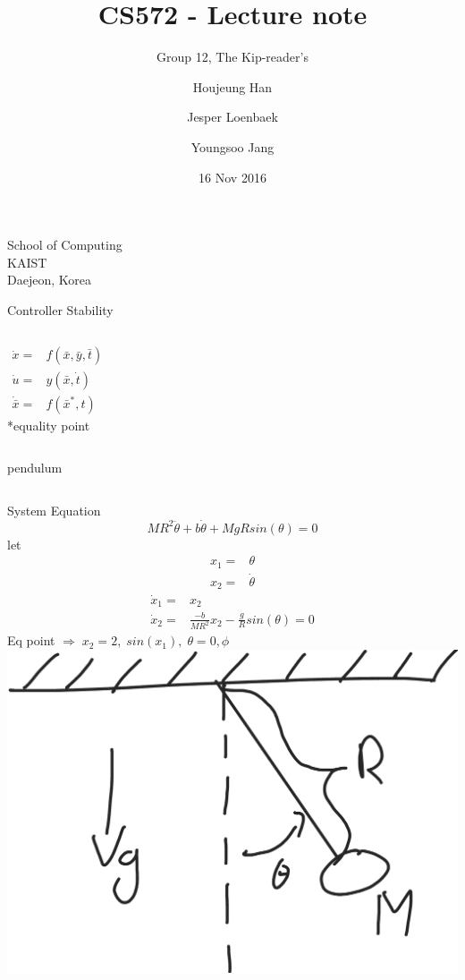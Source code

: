 \documentclass{beamer}
\begin{document}
\title{CS572 - Lecture note}
\subtitle{Group 12, The Kip-reader's}
\author{Houjeung Han \and Jesper Loenbaek \and Youngsoo Jang}
\institute%
{
    School of Computing\\
    KAIST\\
    Daejeon, Korea
}

\date{16 Nov 2016}
\frame{\titlepage}

\begin{frame}{Controller Stability}
    \begin{columns}[T]
    \begin{align*}
        \dot{x} =& f(\bar{x},\bar{y},\bar{t})\\
        \dot{u} =& y(\bar{x},\dot{t})\\
        \dot{\bar{x}} =& f(\bar{x}^*,t)
    \end{align*}
    *equality point
    \end{columns}
\end{frame}

\begin{frame}{pendulum}
    \begin{columns}[T]
    System Equation
    $$MR^2 \ddot{\theta} + b\dot{\theta} + MgRsin(\theta)=0$$
    let
    \vspace*{-0.5cm}
    \begin{align*}
        x_1 =& \theta\\
        x_2 =& \dot{\theta}
    \end{align*}
    \vspace*{-1cm}
    \begin{align*}
        \dot{x}_1 =& x_2\\
        \dot{x}_2 =& \frac{-b}{MR^2}x_2-\frac{g}{R}sin(\theta)=0
    \end{align*}
    Eq point $\Rightarrow \; x_2=2,\; sin(x_1),\; \theta=0,\phi$
        \includegraphics[width=\textwidth]{fig/pendulum.png}   
    \end{columns}
\end{frame}
\end{document}
